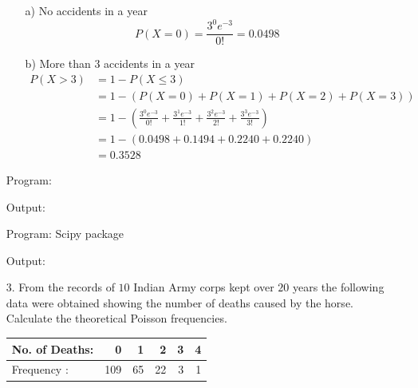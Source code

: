 \documentclass[a4paper,11pt,openright]{report}
\begin{document}
\begin{enumerate}
\begin{enumerate}

\vspace{1cm}

\item[a)] No accidents in a year 
\begin{equation*}
P(X = 0) = \frac{3^{0} e^{-3}}{0!} = 0.0498
\end{equation*}

\vspace{1cm}

\item[b)] More than $3$ accidents in a year 
\begin{equation*}
\begin{split}
		P(X > 3) & = 1 - P(X \leq 3) \\ 
		& = 1 - (P(X = 0) + P(X = 1) + P(X = 2) + P(X = 3)) \\
		& = 1 - \left( \frac{3^{0} e^{-3}}{0!} + \frac{3^{1} e^{-3}}{1!} + \frac{3^{2} e^{-3}}{2!} + \frac{3^{3} e^{-3}}{3!} \right) \\
		& = 1 - (0.0498 + 0.1494 + 0.2240 + 0.2240) \\
		& = 0.3528
\end{split}
\end{equation*}

\end{enumerate}

\vspace{1cm}

Program:

Output:


\vspace{1cm}

Program: Scipy package

Output:


\pagebreak

\item[3.] From the records of $10$ Indian Army corps kept over $20$ years the following data
were obtained showing the number of deaths caused by the horse. Calculate the theoretical
Poisson frequencies. \\
\begin{tabular}{|l|r|r|r|r|r|}
\hline
No. of Deaths: & 0 & 1 & 2 & 3 & 4 \\
\hline
Frequency : & 109 & 65 & 22 & 3 & 1 \\
\hline
\end{tabular} \\


\end{enumerate}
\end{document}
